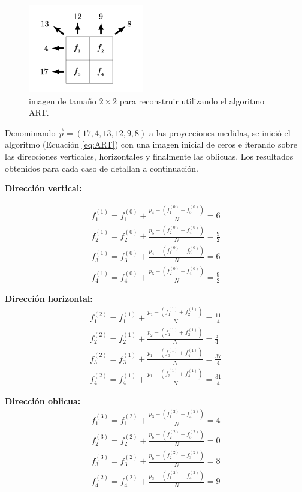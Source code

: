 \documentclass[11pt, twocolumn]{article}
\begin{document}
\begin{figure}[htbp]
  \centering
  \includegraphics[width=0.45\textwidth]{images/ej_1/original_p1.png}
  \caption{imagen de tamaño $2\times2$ para reconstruir utilizando el algoritmo ART.}
  \label{fig:ej_1_orig}
\end{figure}

Denominando $\vec{p}  = (17, 4, 13, 12, 9, 8)$ a las proyecciones medidas, se inició el algoritmo (Ecuación \ref{eq:ART}) con una imagen inicial de ceros e iterando sobre las direcciones verticales, horizontales y finalmente las oblicuas. Los resultados obtenidos para cada caso de detallan a continuación.

\textbf{Dirección vertical:}

\begin{eqnarray*}
  f_1^{(1)} = f_1^{(0)} + \frac{p_4 - (f_1^{(0)}+f_3^{(0)})}{N} =  6 \\
  f_2^{(1)} = f_2^{(0)} + \frac{p_5 - (f_2^{(0)}+f_4^{(0)})}{N} = \frac{9}{2}\\
  f_3^{(1)} = f_3^{(0)} + \frac{p_4 - (f_1^{(0)}+f_3^{(0)})}{N} = 6 \\
  f_4^{(1)} = f_4^{(0)} + \frac{p_5 - (f_2^{(0)}+f_4^{(0)})}{N} = \frac{9}{2}
\end{eqnarray*}


\textbf{Dirección horizontal:}
\begin{eqnarray*}
  f_1^{(2)} = f_1^{(1)} + \frac{p_2 - (f_1^{(1)}+f_2^{(1)})}{N} = \frac{11}{4} \\
  f_2^{(2)} = f_2^{(1)} + \frac{p_2 - (f_1^{(1)}+f_2^{(1)})}{N} = \frac{5}{4}\\
  f_3^{(2)} = f_3^{(1)} + \frac{p_1 - (f_3^{(1)}+f_4^{(1)})}{N} = \frac{37}{4} \\
  f_4^{(2)} = f_4^{(1)} + \frac{p_1 - (f_3^{(1)}+f_4^{(1)})}{N} = \frac{31}{4}
\end{eqnarray*}

\textbf{Dirección oblicua:}
\begin{eqnarray*}
  f_1^{(3)} = f_1^{(2)} + \frac{p_3 - (f_1^{(2)}+f_4^{(2)})}{N} = 4 \\
  f_2^{(3)} = f_2^{(2)} + \frac{p_6 - (f_2^{(2)}+f_3^{(2)})}{N} = 0\\
  f_3^{(3)} = f_3^{(2)} + \frac{p_6 - (f_2^{(2)}+f_3^{(2)})}{N} = 8 \\
  f_4^{(2)} = f_4^{(2)} + \frac{p_3 - (f_1^{(2)}+f_4^{(2)})}{N} = 9
\end{eqnarray*}
\end{document}
